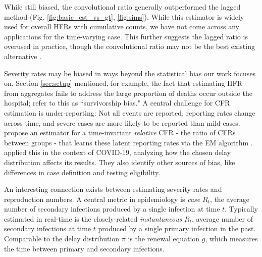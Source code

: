 \documentclass{article}
\begin{document}

While still biased, the convolutional ratio generally outperformed the lagged method (Fig. \ref{fig:basic_est_vs_gt}, \ref{fig:sims}). While this estimator is widely used for overall HFRs with cumulative counts, we have not come across any applications for the time-varying case. This further suggests the lagged ratio is overused in practice, though the convolutional ratio may not be the best existing alternative \citep{fusedlasso, UKpaper}.

Severity rates may be biased in ways beyond the statistical bias our work focuses on. Section \ref{sec:setup} mentioned, for example, the fact that estimating HFR from aggregates fails to address the large proportion of deaths occur outside the hospital; \citet{lipsitch2015potential} refer to this as ``survivorship bias." A central challenge for CFR estimation is under-reporting: Not all events are reported, reporting rates change across time, and severe cases are more likely to be reported than mild cases. \citet{reich2012estimating} propose an estimator for a time-invariant \textit{relative} CFR - the ratio of CFRs between groups - that learns these latent reporting rates via the EM algorithm \citep{EM}. \citet{anastasios} applied this in the context of COVID-19, analyzing how the chosen delay distribution affects its results. They also identify other sources of bias, like differences in case definition and testing eligibility.

An interesting connection exists between estimating severity rates and reproduction numbers. A central metric in epidemiology is \textit{case} $R_t$, the average number of secondary infections produced by a single infection at time $t$. Typically estimated in real-time is the closely-related \textit{instantaneous} $R_t$, average number of secondary infections at time $t$ produced by a single primary infection in the past. Comparable to the delay distribution $\pi$ is the renewal equation $g$, which measures the time between primary and secondary infections.
\end{document}

